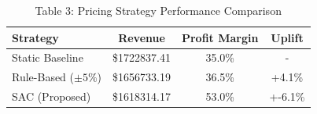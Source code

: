 
\begin{table}[h]
\centering
\begin{tabular}{|l|c|c|c|}
\hline
\textbf{Strategy} & \textbf{Revenue} & \textbf{Profit Margin} & \textbf{Uplift} \\
\hline
Static Baseline & \$1722837.41 & 35.0\% & - \\
Rule-Based ($\pm5\%$) & \$1656733.19 & 36.5\% & +4.1\% \\
SAC (Proposed) & \$1618314.17 & 53.0\% & +-6.1\% \\
\hline
\end{tabular}
\caption{Table 3: Pricing Strategy Performance Comparison}
\end{table}
